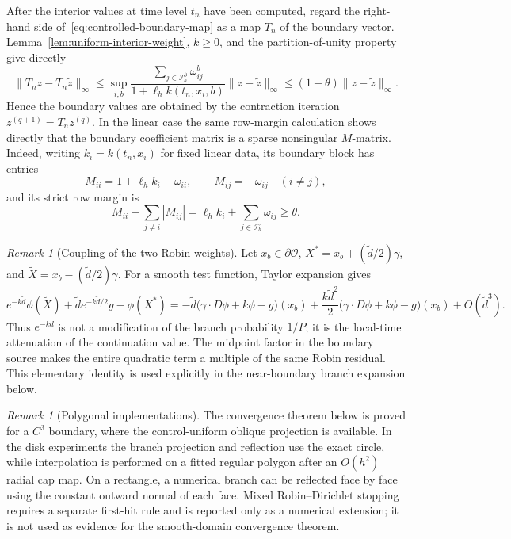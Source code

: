 \documentclass[11pt]{article}
\theoremstyle{definition}
\theoremstyle{remark}
\newtheorem{remark}[theorem]{Remark}
\newcommand{\cO}{\mathcal{O}}
\begin{document}
	After the interior values at time level $t_n$ have been computed, regard the
	right-hand side of~\eqref{eq:controlled-boundary-map} as a map $T_n$ of the
	boundary vector.  Lemma~\ref{lem:uniform-interior-weight}, $k\ge0$, and the
	partition-of-unity property give directly
	\[
	\|T_nz-T_n\widetilde z\|_\infty
	\le\sup_{i,b}
	\frac{\sum_{j\in\mathcal I_h^\partial}\omega_{ij}^b}
	{1+\ell_hk(t_n,x_i,b)}
	\|z-\widetilde z\|_\infty
	\le(1-\theta)\|z-\widetilde z\|_\infty.
	\]
	Hence the boundary values are obtained by the contraction iteration
	$z^{(q+1)}=T_nz^{(q)}$.  In the linear case the same row-margin calculation
	shows directly that the boundary coefficient matrix is a sparse nonsingular
	$M$-matrix.  Indeed, writing $k_i=k(t_n,x_i)$ for fixed linear data, its
	boundary block has entries
	\[
	M_{ii}=1+\ell_h k_i-\omega_{ii},\qquad
	M_{ij}=-\omega_{ij}\quad(i\ne j),
	\]
	and its strict row margin is
	\[
	M_{ii}-\sum_{j\ne i}|M_{ij}|
	=\ell_h k_i+\sum_{j\in\mathcal I_h^\circ}\omega_{ij}
	\ge\theta.
	\]
	\begin{remark}[Coupling of the two Robin weights]\label{rem:coupled-weights}
		Let $x_b\in\partial\cO$,
		$X^*=x_b+(\widetilde d/2)\gamma$, and
		$\widetilde X=x_b-(\widetilde d/2)\gamma$.  For a smooth test function,
		Taylor expansion gives
		\[
		e^{-k\widetilde d}\phi(\widetilde X)
		+\widetilde d e^{-k\widetilde d/2}g-\phi(X^*)
		=-\widetilde d\bigl(\gamma\cdot D\phi+k\phi-g\bigr)(x_b)
		+\frac{k\widetilde d^2}{2}
		\bigl(\gamma\cdot D\phi+k\phi-g\bigr)(x_b)
		+O(\widetilde d^3).
		\]
		Thus $e^{-k\widetilde d}$ is not a modification of the branch probability $1/P$; it is
		the local-time attenuation of the continuation value.  The midpoint factor in
		the boundary source makes the entire quadratic term a multiple of the same
		Robin residual.  This elementary identity is used explicitly in the
		near-boundary branch expansion below.
	\end{remark}
	
	\begin{remark}[Polygonal implementations]
		The convergence theorem below is proved for a $C^3$ boundary, where the control-uniform oblique projection is available.  In the disk experiments the branch projection and reflection use the exact circle, while interpolation is performed on a fitted regular polygon after an $O(h^2)$ radial cap map.  On a rectangle, a numerical branch can be reflected face by face using the constant outward normal of each face.  Mixed Robin--Dirichlet stopping requires a separate first-hit rule and is reported only as a numerical extension; it is not used as evidence for the smooth-domain convergence theorem.
	\end{remark}
	
\end{document}
